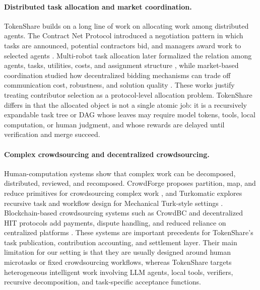 \documentclass{article}
\theoremstyle{plain}
\begin{document}
\paragraph{Distributed task allocation and market coordination.}
TokenShare builds on a long line of work on allocating work among distributed agents. The Contract Net Protocol introduced a negotiation pattern in which tasks are announced, potential contractors bid, and managers award work to selected agents \citep{smith1980contract}. Multi-robot task allocation later formalized the relation among agents, tasks, utilities, costs, and assignment structure \citep{gerkey2004formal}, while market-based coordination studied how decentralized bidding mechanisms can trade off communication cost, robustness, and solution quality \citep{dias2006market}. These works justify treating contributor selection as a protocol-level allocation problem. TokenShare differs in that the allocated object is not a single atomic job: it is a recursively expandable task tree or DAG whose leaves may require model tokens, tools, local computation, or human judgment, and whose rewards are delayed until verification and merge succeed.

\paragraph{Complex crowdsourcing and decentralized crowdsourcing.}
Human-computation systems show that complex work can be decomposed, distributed, reviewed, and recomposed. CrowdForge proposes partition, map, and reduce primitives for crowdsourcing complex work \citep{kittur2011crowdforge}, and Turkomatic explores recursive task and workflow design for Mechanical Turk-style settings \citep{kulkarni2011turkomatic}. Blockchain-based crowdsourcing systems such as CrowdBC and decentralized HIT protocols add payments, dispute handling, and reduced reliance on centralized platforms \citep{li2018crowdbc,liang2022decentralizedhit}. These systems are important precedents for TokenShare's task publication, contribution accounting, and settlement layer. Their main limitation for our setting is that they are usually designed around human microtasks or fixed crowdsourcing workflows, whereas TokenShare targets heterogeneous intelligent work involving LLM agents, local tools, verifiers, recursive decomposition, and task-specific acceptance functions.
\end{document}
